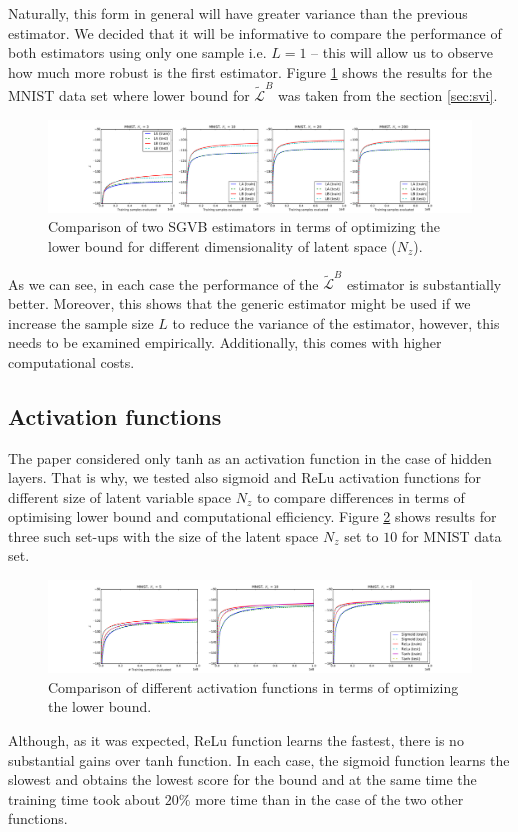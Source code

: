\documentclass[../report/report.tex]{subfiles}
\begin{document}
Naturally, this form in general will have greater variance than the previous estimator. We decided that it will be informative to compare the performance of both estimators using only one sample i.e. $L=1$ -- this will allow us to observe how much more robust is the first estimator. Figure \ref{fig:mnist_LAvsLB} shows the results for the MNIST data set where lower bound for $\widetilde{\mathcal{L}}^{B}$ was taken from the section \ref{sec:svi}.

\begin{figure}[!htb]
\centering
\includegraphics[width=0.8\linewidth]{../../res/mnist_LAvsLB}

  \caption[1]{Comparison of two SGVB estimators in terms of optimizing the lower bound for different dimensionality of latent space ($N_z$). }
  \label{fig:mnist_LAvsLB}
\end{figure}

As we can see, in each case the performance of the $\widetilde{\mathcal{L}}^{B}$ estimator is substantially better. Moreover, this shows that the generic estimator might be used if we increase the sample size $L$ to reduce the variance of the estimator, however, this needs to be examined empirically. Additionally, this comes with higher computational costs.

\subsection{Activation functions}
The paper considered only $\text{tanh}$ as an activation function in the case of hidden layers. That is why, we tested also sigmoid and ReLu activation functions for different size of latent variable space $N_z$ to compare differences in terms of optimising lower bound and computational efficiency. Figure \ref{fig:mnist_activation} shows results for three such set-ups with the size of the latent space  $N_z$ set to $10$ for MNIST data set.

\begin{figure}[!htb]
\centering
\includegraphics[width=0.8\linewidth]{../../res/mnist_activations}
  \caption[1]{Comparison of different activation functions in terms of optimizing the lower bound. }
\label{fig:mnist_activation}
\end{figure}

Although, as it was expected, ReLu function learns the fastest, there is no substantial gains over tanh function. In each case, the sigmoid function learns the slowest and obtains the lowest score for the bound and at the same time the training time took about $20\%$ more time than in the case of the two other functions.
\end{document}
